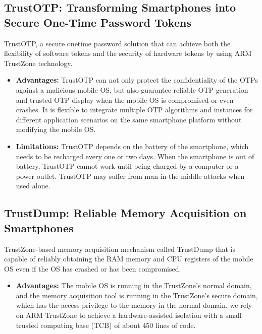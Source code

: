 \documentclass[conference]{IEEEtran}
\begin{document}
\subsection{TrustOTP: Transforming Smartphones into Secure One-Time Password Tokens}
TrustOTP, a secure onetime password solution that can achieve both the flexibility of software tokens and the security of hardware tokens by using ARM TrustZone technology.
\begin{itemize}
    \item \textbf{Advantages:} TrustOTP can not only protect the confidentiality of the OTPs against a malicious mobile OS, but also guarantee reliable OTP generation and trusted OTP display when the mobile OS is compromised or even crashes. It is flexible to integrate multiple OTP algorithms and instances for different application scenarios on the same smartphone platform without modifying the mobile OS.
    \item \textbf{Limitations:} TrustOTP depends on the battery of the smartphone, which needs to be recharged every one or two days. When the smartphone is out of battery, TrustOTP cannot work until being charged by a computer or a power outlet. TrustOTP may suffer from man-in-the-middle attacks when used alone.
\end{itemize}


\subsection{TrustDump: Reliable Memory Acquisition on Smartphones}
TrustZone-based memory acquisition mechanism called TrustDump that is capable of reliably obtaining the RAM memory and CPU registers of the mobile OS even if the OS has crashed or has been compromised.
\begin{itemize}
    \item \textbf{Advantages:} The mobile OS is running in the TrustZone’s normal domain, and the memory acquisition tool is running in the TrustZone’s secure domain, which has the access privilege to the memory in the normal domain.  we rely on ARM TrustZone to achieve a hardware-assisted isolation with a small trusted computing base (TCB) of about 450 lines of code.
\end{itemize}
\end{document}
